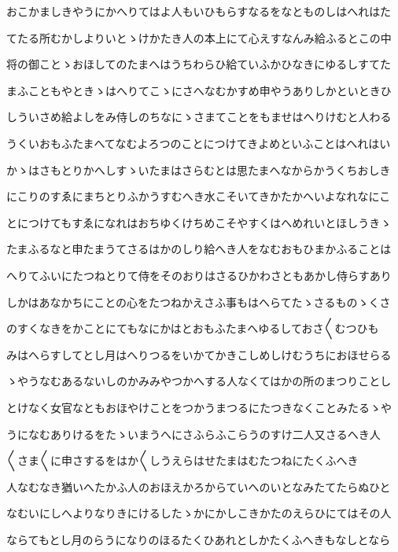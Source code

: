 \documentclass[a4paper,11pt,landscape]{ltjtarticle}
\begin{document}
\par\medskip
おこかましきやうにかへりてはよ人もいひもらすなるをなとものしはへれはた
\par\medskip
てたる所むかしよりいとゝけかたき人の本上にて心えすなんみ給ふるとこの中
\par\medskip
将の御ことゝおほしてのたまへはうちわらひ給ていふかひなきにゆるしすてた
\par\medskip
まふこともやときゝはへりてこゝにさへなむかすめ申やうありしかといときひ
\par\medskip
しういさめ給よしをみ侍しのちなにゝさまてことをもませはへりけむと人わる
\par\medskip
うくいおもふたまへてなむよろつのことにつけてきよめといふことはへれはい
\par\medskip
かゝはさもとりかへしすゝいたまはさらむとは思たまへなからかうくちおしき
\par\medskip
にこりのすゑにまちとりふかうすむへき水こそいてきかたかへいよなれなにこ
\par\medskip
とにつけてもすゑになれはおちゆくけちめこそやすくはへめれいとほしうきゝ
\par\medskip
たまふるなと申たまうてさるはかのしり給へき人をなむおもひまかふることは
\par\medskip
へりてふいにたつねとりて侍をそのおりはさるひかわさともあかし侍らすあり
\par\medskip
しかはあなかちにことの心をたつねかえさふ事もはへらてたゝさるものゝくさ
\par\medskip
のすくなきをかことにてもなにかはとおもふたまへゆるしておさ〱むつひも
\par\medskip
みはへらすしてとし月はへりつるをいかてかきこしめしけむうちにおほせらる
\par\medskip
ゝやうなむあるないしのかみみやつかへする人なくてはかの所のまつりことし
\par\medskip
とけなく女官なともおほやけことをつかうまつるにたつきなくことみたるゝや
\par\medskip
うになむありけるをたゝいまうへにさふらふこらうのすけ二人又さるへき人
\par\medskip
〱さま〱に申さするをはか〱しうえらはせたまはむたつねにたくふへき
\par\medskip
人なむなき猶いへたかふ人のおほえかろからていへのいとなみたてたらぬひと
\par\medskip
なむいにしへよりなりきにけるしたゝかにかしこきかたのえらひにてはその人
\par\medskip
ならてもとし月のらうになりのほるたくひあれとしかたくふへきもなしとなら
\par\medskip
\end{document}
